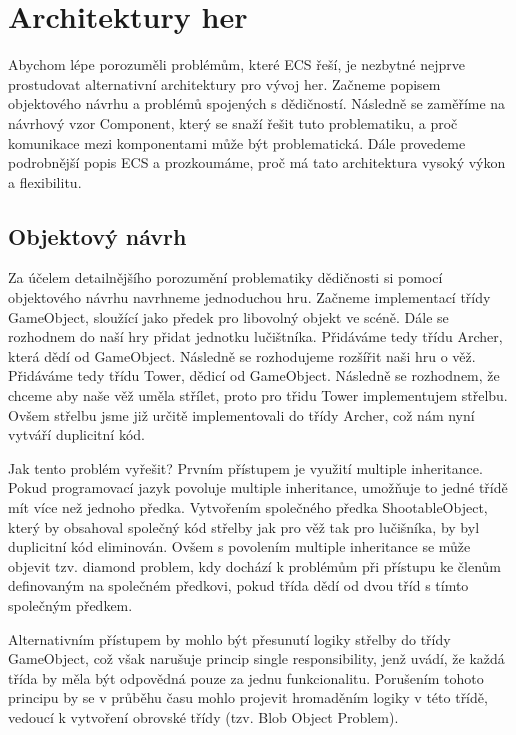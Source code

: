 
\chapter{Architektury her}
Abychom lépe porozuměli problémům, které ECS řeší, je nezbytné nejprve prostudovat alternativní architektury pro vývoj her. Začneme popisem objektového návrhu a problémů spojených s dědičností. Následně se zaměříme na návrhový vzor Component, který se snaží řešit tuto problematiku, a proč komunikace mezi komponentami může být problematická. Dále provedeme podrobnější popis ECS a prozkoumáme, proč má tato architektura vysoký výkon a flexibilitu.

\section{Objektový návrh}
Za účelem detailnějšího porozumění problematiky dědičnosti si pomocí objektového návrhu navrhneme jednoduchou hru. Začneme implementací třídy GameObject, sloužící jako předek pro libovolný objekt ve scéně. Dále se rozhodnem do naší hry přidat jednotku lučištníka. Přidáváme tedy třídu Archer, která dědí od GameObject. Následně se rozhodujeme rozšířit naši hru o věž. Přidáváme tedy třídu Tower, dědicí od GameObject. Následně se rozhodnem, že chceme aby naše věž uměla střílet, proto pro třidu Tower implementujem střelbu. Ovšem střelbu jsme již určitě implementovali do třídy Archer, což nám nyní vytváří duplicitní kód.

Jak tento problém vyřešit? Prvním přístupem je využití multiple inheritance. Pokud programovací jazyk povoluje multiple inheritance, umožňuje to jedné třídě mít více než jednoho předka. Vytvořením společného předka ShootableObject, který by obsahoval společný kód střelby jak pro věž tak pro lučišníka, by byl duplicitní kód eliminován. Ovšem s povolením multiple inheritance se může objevit tzv. diamond problem, kdy dochází k problémům při přístupu ke členům definovaným na společném předkovi, pokud třída dědí od dvou tříd s tímto společným předkem.

Alternativním přístupem by mohlo být přesunutí logiky střelby do třídy GameObject, což však narušuje princip single responsibility, jenž uvádí, že každá třída by měla být odpovědná pouze za jednu funkcionalitu. Porušením tohoto principu by se v průběhu času mohlo projevit hromaděním logiky v této třídě, vedoucí k vytvoření obrovské třídy (tzv. Blob Object Problem).

